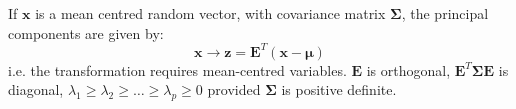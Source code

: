 
\begin{definition}
\label{def:princomp}
If $\boldsymbol{x}$ is a mean centred random vector, with covariance matrix $\boldsymbol{\Sigma}$, the principal components are given by:
\begin{equation}
\boldsymbol{x} \rightarrow \boldsymbol{z} = \boldsymbol{E}^{T}(\boldsymbol{x} - \boldsymbol{\mu})
\end{equation}
i.e. the transformation requires mean-centred variables.   $\boldsymbol{E}$ is orthogonal, $\boldsymbol{E}^{T}\boldsymbol{\Sigma}\boldsymbol{E}$ is diagonal, $\lambda_{1} \geq \lambda_{2} \geq \ldots \geq \lambda_{p} \geq 0$ provided $\boldsymbol{\Sigma}$ is positive definite.
\end{definition}